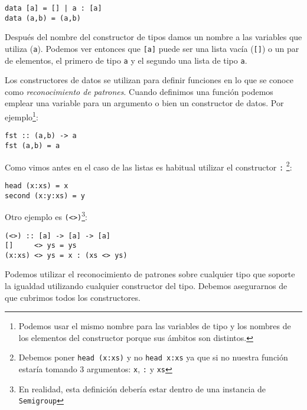 \begin{lstlisting}
data [a] = [] | a : [a]
data (a,b) = (a,b)
\end{lstlisting}

Después del nombre del constructor de tipos damos un nombre a las variables que
utiliza (\texttt{a}). Podemos ver entonces que  \texttt{[a]} puede
ser una lista vacía (\texttt{[]}) o un par de elementos, el primero de tipo
\texttt{a} y el segundo una lista de tipo \texttt{a}.

Los constructores de datos se utilizan para definir funciones en lo que se conoce
como \textit{reconocimiento de patrones}. Cuando definimos una función podemos
emplear una variable para un argumento o bien un constructor de datos.
Por ejemplo\footnote{Podemos usar el mismo nombre para las variables de tipo y
los nombres de los elementos del constructor porque sus ámbitos son distintos.}:

\begin{lstlisting}
fst :: (a,b) -> a
fst (a,b) = a
\end{lstlisting}

Como vimos antes en el caso de las listas es habitual utilizar el constructor
\texttt{:}
\footnote{Debemos poner \texttt{head (x:xs)} y no \texttt{head x:xs} ya que si
no nuestra función estaría tomando 3 argumentos: \texttt{x}, \texttt{:} y \texttt{xs}
}:

\begin{lstlisting}
head (x:xs) = x
second (x:y:xs) = y
\end{lstlisting}

Otro ejemplo es \texttt{(<>)}\footnote{En realidad, esta definición debería estar dentro de una instancia de \texttt{Semigroup}}:
\begin{lstlisting}
(<>) :: [a] -> [a] -> [a]
[]     <> ys = ys
(x:xs) <> ys = x : (xs <> ys)
\end{lstlisting}

Podemos utilizar el reconocimiento de patrones sobre cualquier tipo que soporte
la igualdad utilizando cualquier constructor del tipo. Debemos asegurarnos de que
cubrimos todos los constructores.
